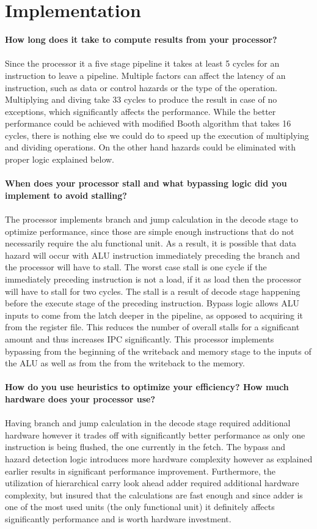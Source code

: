 \section*{Implementation}
\textbf{How long does it take to compute results from your processor?}\\
\\
Since the processor it a five stage pipeline it takes at least 5 cycles for an instruction to leave a pipeline. Multiple factors can affect the latency of an instruction, such as data or control hazards or the type of the operation. Multiplying and diving take 33 cycles to produce the result in case of no exceptions, which significantly affects the performance. While the better performance could be achieved with modified Booth algorithm that takes 16 cycles, there is nothing else we could do to speed up the execution of multiplying and dividing operations. On the other hand hazards could be eliminated with proper logic explained below.\\
\\
\textbf{When does your processor stall and what bypassing logic did you implement to avoid stalling?}\\
\\
The processor implements branch and jump calculation in the decode stage to optimize performance, since those are simple enough instructions that do not necessarily require the alu functional unit. As a result, it is possible that data hazard will occur with ALU instruction immediately preceding the branch and the processor will have to stall. The worst case stall is one cycle if the immediately preceding instruction is not a load, if it as load then the processor will have to stall for two cycles. The stall is a result of decode stage happening before the execute stage of the preceding instruction. Bypass logic allows ALU inputs to come from the latch deeper in the pipeline, as opposed to acquiring it from the register file. This reduces the number of overall stalls for a significant amount and thus increases IPC significantly. This processor implements bypassing from the beginning of the writeback and memory stage to the inputs of the ALU as well as from the from the writeback to the memory. \\
\\
\textbf{How do you use heuristics to optimize your efficiency?
How much hardware does your processor use?}\\
\\
Having branch and jump calculation in the decode stage required additional hardware however it trades off with significantly better performance as only one instruction is being flushed, the one currently in the fetch. The bypass and hazard detection logic introduces more hardware complexity however as explained earlier results in significant performance improvement. Furthermore, the utilization of hierarchical carry look ahead adder required additional hardware complexity, but insured that the calculations are fast enough and since adder is one of the most used units (the only functional unit) it definitely affects significantly performance and is worth hardware investment. \\ 
\\

